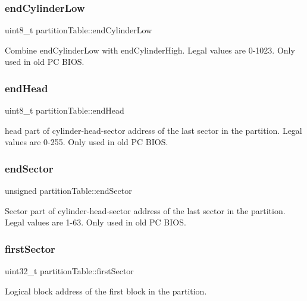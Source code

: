 \subsubsection{\texorpdfstring{end\+Cylinder\+Low}{endCylinderLow}}
{\footnotesize\ttfamily uint8\+\_\+t partition\+Table\+::end\+Cylinder\+Low}

Combine end\+Cylinder\+Low with end\+Cylinder\+High. Legal values are 0-\/1023. Only used in old PC B\+I\+OS. \mbox{\label{structpartition_table_a4a3945bfd3a29f474984cb9f180dbd51}} 
\subsubsection{\texorpdfstring{end\+Head}{endHead}}
{\footnotesize\ttfamily uint8\+\_\+t partition\+Table\+::end\+Head}

head part of cylinder-\/head-\/sector address of the last sector in the partition. Legal values are 0-\/255. Only used in old PC B\+I\+OS. \mbox{\label{structpartition_table_a27cdc4320c418ed0d833ab163ed77ad7}} 
\subsubsection{\texorpdfstring{end\+Sector}{endSector}}
{\footnotesize\ttfamily unsigned partition\+Table\+::end\+Sector}

Sector part of cylinder-\/head-\/sector address of the last sector in the partition. Legal values are 1-\/63. Only used in old PC B\+I\+OS. \mbox{\label{structpartition_table_a02bbdff840c854dc96fa0b6da8589d86}} 
\subsubsection{\texorpdfstring{first\+Sector}{firstSector}}
{\footnotesize\ttfamily uint32\+\_\+t partition\+Table\+::first\+Sector}

Logical block address of the first block in the partition. \mbox{\label{structpartition_table_acf96e59ce648a9a0cf35751c3b6d7730}} 

